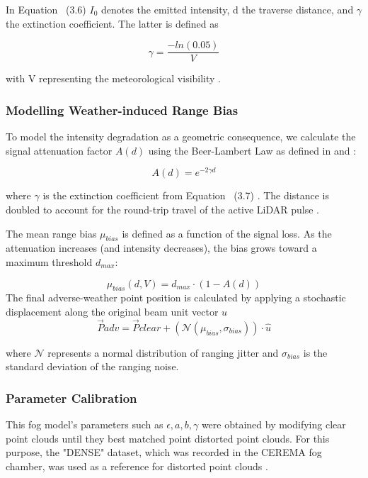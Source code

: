 In Equation ~(3.6) $I_0$ denotes the emitted intensity, d the traverse distance, and $\gamma$ the extinction coefficient. The latter is defined as 

\begin{equation}
     \gamma = \dfrac{-ln(0.05)}{V}
\end{equation}

with V representing the meteorological visibility \cite {teufel_simulating_2022}. 


\subsubsection{Modelling Weather-induced Range Bias}

To model the intensity degradation as a geometric consequence, we calculate the signal attenuation factor $A(d)$ using the Beer-Lambert Law as defined in \cite[p. 22]{teufel_simulating_2022} and \cite[p. 11]{haider_methodology_2023}:

\begin{equation} 
A(d) = e^{-2\gamma d}
\end{equation}

where $\gamma$ is the extinction coefficient from Equation ~(3.7) \cite{teufel_enhancing_2023}. The distance is doubled to account for the round-trip travel of the active LiDAR pulse \cite[p 11]{haider_methodology_2023}.

The mean range bias $\mu_{bias}$ is defined as a function of the signal loss. As the attenuation increases (and intensity decreases), the bias grows toward a maximum threshold $d_{max}$:

\begin{equation} 
\mu_{bias}(d, V) = d_{max} \cdot (1 - A(d)) 
\end{equation}
The final adverse-weather point position is calculated by applying a stochastic displacement along the original beam unit vector $u$
\begin{equation}
\vec{P}{adv} = \vec{P}{clear} + \left( \mathcal{N}(\mu_{bias}, \sigma_{bias}) \right) \cdot \hat{u}
\end{equation}

where $\mathcal{N}$ represents a normal distribution of ranging jitter and $\sigma_{bias}$ is the standard deviation of the ranging noise.


\subsubsection{Parameter Calibration}
This fog model's parameters such as $\epsilon, a, b, \gamma$ were obtained by modifying clear point clouds until they best matched point distorted point clouds. For this purpose, the "DENSE" dataset, which was recorded in the CEREMA fog chamber, was used as a reference for distorted point clouds \cite{bijelic_seeing_2019} \cite{teufel_simulating_2022}. 

